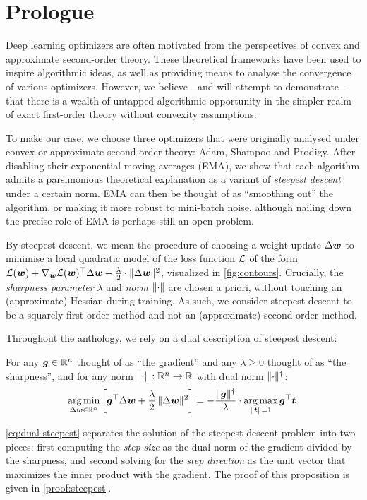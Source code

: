 \section*{Prologue}

Deep learning optimizers are often motivated from the perspectives of convex and approximate second-order theory. These theoretical frameworks have been used to inspire algorithmic ideas, as well as providing means to analyse the convergence of various optimizers. However, we believe---and will attempt to demonstrate---that there is a wealth of untapped algorithmic opportunity in the simpler realm of exact first-order theory without convexity assumptions.


To make our case, we choose three optimizers that were originally analysed under convex or approximate second-order theory: Adam, Shampoo and Prodigy. After disabling their exponential moving averages (EMA), we show that each algorithm admits a parsimonious theoretical explanation as a variant of \textit{steepest descent} under a certain norm. EMA can then be thought of as ``smoothing out'' the algorithm, or making it more robust to mini-batch noise, although nailing down the precise role of EMA is perhaps still an open problem.

By steepest descent, we mean the procedure of choosing a weight update $\Delta {\bm{w}}$ to minimise a local quadratic model of the loss function $\mathcal{L}$ of the form $\mathcal{L}({\bm{w}}) + \nabla_{\bm{w}} \mathcal{L}({\bm{w}})^\top\Delta{\bm{w}} + \frac{\lambda}{2}\cdot \Vert {\Delta {\bm{w}}} \Vert^2$, visualized in \cref{fig:contours}. Crucially, the \textit{sharpness parameter} $\lambda$ and \textit{norm} $\Vert {\cdot} \Vert$ are chosen a priori, without touching an (approximate) Hessian during training. As such, we consider steepest descent to be a squarely first-order method and not an (approximate) second-order method.

Throughout the anthology, we rely on a dual description of steepest descent:
\begin{myproposition}\label{prop:steepest} For any ${\bm{g}} \in \mathbb{R}^n$ thought of as ``the gradient'' and any $\lambda \geq 0$ thought of as ``the sharpness'', and for any norm $\Vert {\cdot} \Vert:\mathbb{R}^n\to\mathbb{R}$ with dual norm $\Vert {\cdot} \Vert^\dagger$:
\begin{align}\label{eq:dual-steepest}
    \operatorname*{arg\,min}_{\Delta {\bm{w}} \in \mathbb{R}^n} \left[{\bm{g}}^\top \Delta {\bm{w}} + \frac{\lambda}{2} \, \Vert {\Delta {\bm{w}}} \Vert^2 \right] = - \frac{\Vert {{\bm{g}}} \Vert^\dagger}{\lambda} \cdot \operatorname*{arg\,max}_{\Vert {{\bm{t}}} \Vert=1} {\bm{g}}^\top {\bm{t}}.
\end{align}
\end{myproposition}
\cref{eq:dual-steepest} separates the solution of the steepest descent problem into two pieces: first computing the \textit{step size} as the dual norm of the gradient divided by the sharpness, and second solving for the \textit{step direction} as the unit vector that maximizes the inner product with the gradient. The proof of this proposition is given in \cref{proof:steepest}.

